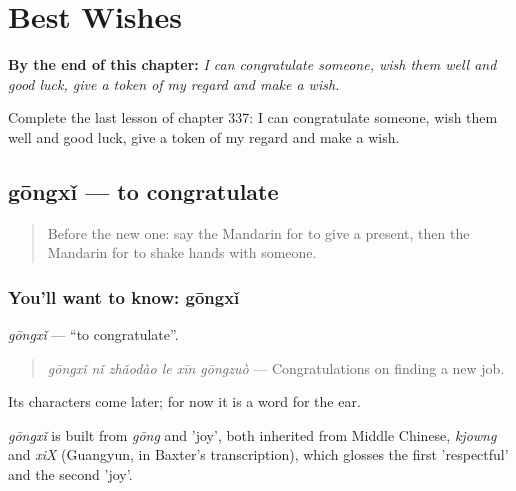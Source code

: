 
\chapter{Best Wishes}
\label{ch:zh-best-wishes}

\begin{chapteropening}
\textbf{By the end of this chapter:} \emph{I can congratulate someone, wish them well and good luck, give a token of my regard and make a wish.}

Complete the last lesson of chapter 337: I can congratulate someone, wish them well and good luck, give a token of my regard and make a wish.
\end{chapteropening}

\section[gōngxǐ]{gōngxǐ — to congratulate}

\label{lesson:ZH-C337-gongxi}



\begin{quote}
Before the new one: say the Mandarin for to give a present, then the Mandarin for to shake hands with someone.
\end{quote}

\subsection*{You'll want to know: gōngxǐ}
\emph{gōngxǐ} — \textquotedblleft{}to congratulate\textquotedblright{}.

\begin{quote}
\emph{gōngxǐ nǐ zhǎodào le xīn gōngzuò} — Congratulations on finding a new job.
\end{quote}

Its characters come later; for now it is a word for the ear.

\begin{cousinweb}
\emph{gōngxǐ} is built from \emph{gōng} and  'joy', both inherited from Middle Chinese, \emph{kjowng} and \emph{xiX} (Guangyun, in Baxter's transcription), which glosses the first 'respectful' and the second 'joy'.
\end{cousinweb}

